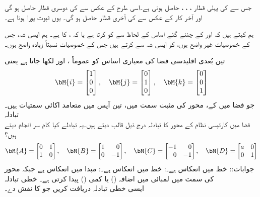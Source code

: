 جس سے  کی پہلی قطار ، ، ،   حاصل ہوتی ہے۔اسی طرح  کے عکس سے  کی دوسری قطار حاصل ہو گی اور آخر کار  کے عکس سے  کی آخری قطار حاصل ہو گی۔ یوں ثبوت پورا ہوتا ہے۔

ہم کہتے ہیں کہ  اور  کے چننے گئے  اساس کے لحاظ سے    کو   کرتا ہے  یا کہ ،  کا  ہے۔ ہم  ایسی شہ، جس کے خصوصیات غیر واضح ہوں، کو ایسی شہ سے  کرتے ہیں جس کے خصوصیات نسبتاً زیادہ واضح ہوں۔

تین بُعدی اقلیدسی فضا  کی معیاری اساس کو عموماً ،  اور  لکھا جاتا ہے یعنی
\begin{align}
\bM{i}=\begin{bmatrix} 1\\0\\0 \end{bmatrix},\quad \bM{j}=\begin{bmatrix}0\\1\\0  \end{bmatrix}, \quad \bM{k}=\begin{bmatrix}0\\0\\1  \end{bmatrix}
\end{align}
جو فضا میں  کے، محور کی مثبت سمت میں، تین آپس میں  متعامد  اکائی سمتیات ہیں۔
\quad تبادلہ\\
فضا میں کارتیسی نظام کے محور کا تبادلہ درج ذیل قالب دیتے ہیں۔یہ تبادلے کیا کام سر انجام دیتے ہیں؟
\begin{align*}
\bM{A}=\begin{bmatrix*}[r]0&1\\1&0  \end{bmatrix*}, \quad \bM{B}=\begin{bmatrix*}[r]1&0\\0&-1  \end{bmatrix*}, \quad \bM{C}=\begin{bmatrix*}[r]-1&0\\0&-1  \end{bmatrix*}, \quad \bM{D}=\begin{bmatrix*}[r]a&0\\0&1  \end{bmatrix*}
\end{align*}
جوابات:: خط  میں انعکاس ہے۔: خط  میں انعکاس ہے۔: مبدا میں انعکاس ہے جبکہ  محور  کی سمت میں لمبائی میں اضافہ () یا کمی () پیدا کرتی ہے۔  
\quad خطی تبادلہ\\
ایسی خطی تبادلہ دریافت کریں جو   کا نقش  دے۔

